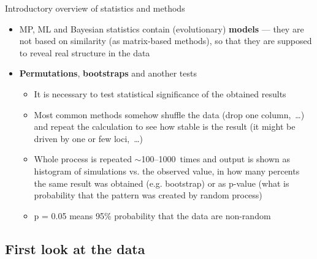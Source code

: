 \documentclass[compress, ucs, xelatex, 11pt, xcolor=svgnames,
  hyperref={
    bookmarks=true,
    unicode=true,
    colorlinks=true,
    pdftitle={Molecular data in R},
    plainpages=false,
    pdfauthor={Vojtech Zeisek},
    pdfsubject={Course about phylogeny and evolution in R},
    pdfcreator={XeLaTeX},
    pdfkeywords={R, evolution, phylogeny, molecular data},
    linkcolor=Tomato,
    anchorcolor=SaddleBrown,
    citecolor=Goldenrod,
    filecolor=DarkMagenta,
    menucolor=Sienna,
    urlcolor=DarkTurquoise,
    pdftex},
  url={hyphens, lowtilde} %
  ]{beamer}
\begin{document}
\begin{frame}[allowframebreaks]{Introductory overview of statistics and methods}
\begin{itemize}
\begin{itemize}
      \item Methods are looking for the best (e.g. evolutionary) \textbf{model} (e.g. phylogenetic tree) \textbf{explaining the data} (e.g. DNA sequences)
      \item Algorithm exploring possible models and approaching the best runs in steps (generations)
      \begin{itemize}
	\item After some time it converges to find optimal solution (usually described by logarithms of likelihood of given model)
	\item Usually, $\sim$millions (or even more) of generations are required
	\item Beginning use to be very unstable --- it is discarded as burn-in (``heating'' of Markov Chain Monte Carlo (MCMC) doing the exploration and optimization of models), usually $\sim$10--25\%~of steps
      \end{itemize}
    \end{itemize}
    \item MP, ML and Bayesian statistics contain (evolutionary) \textbf{models} --- they are not based on similarity (as matrix-based methods), so that they are supposed to reveal real structure in the data
    \item \textbf{Permutations}, \textbf{bootstraps} and another tests
    \begin{itemize}
      \item It is necessary to test statistical significance of the obtained results
      \item Most common methods somehow shuffle the data (drop one column,~\ldots) and repeat the calculation to see how stable is the result (it might be driven by one or few loci,~\ldots)
      \item Whole process is repeated $\sim$100--1000~times and output is shown as histogram of simulations vs. the observed value, in how many percents the same result was obtained (e.g. bootstrap) or as p-value (what is probability that the pattern was created by random process)
      \item p = 0.05 means 95\% probability that the data are non-random
    \end{itemize}
  \end{itemize}
\end{frame}

\subsection{First look at the data}
\end{document}
